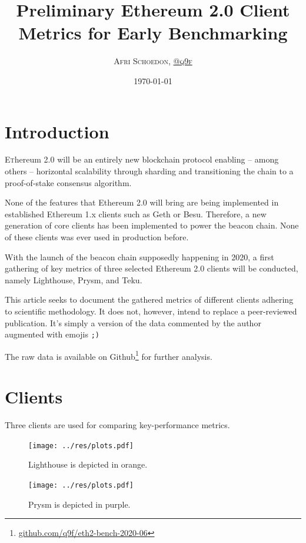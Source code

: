 \documentclass[twoside,twocolumn]{article}
\title{Preliminary Ethereum 2.0 Client Metrics for Early Benchmarking}
\author{\textsc{Afri Schoedon, \href{https://github.com/q9f}{@q9f}}}\date{\today}
\begin{document}
\maketitle
\section{Introduction}
\lettrine[nindent=0em,lines=3]{E}thereum 2.0 will be an entirely new blockchain protocol enabling -- among others -- horizontal scalability through sharding and transitioning the chain to a proof-of-stake consensus algorithm.\par

None of the features that Ethereum 2.0 will bring are being implemented in established Ethereum 1.x clients such as Geth or Besu. Therefore, a new generation of core clients has been implemented to power the beacon chain. None of these clients was ever used in production before.\par

With the launch of the beacon chain supposedly happening in 2020, a first gathering of key metrics of three selected Ethereum 2.0 clients will be conducted, namely Lighthouse, Prysm, and Teku.\par

This article seeks to document the gathered metrics of different clients adhering to scientific methodology. It does not, however, intend to replace a peer-reviewed publication. It's simply a version of the data commented by the author augmented with emojis \texttt{;)}\par

The raw data is available on Github\footnote{\href{https://github.com/q9f/eth2-bench-2020-06}{github.com/q9f/eth2-bench-2020-06}} for further analysis.

\section{Clients}
\label{sec:cli}

Three clients are used for comparing key-performance metrics.\par

\begin{figure}[t]
	\centering
	\texttt{[image: ../res/plots.pdf]}
	\caption{Lighthouse is depicted in orange.}
	\label{img:lh}
\end{figure}

\begin{figure}[t]
	\centering
	\texttt{[image: ../res/plots.pdf]}
	\caption{Prysm is depicted in purple.}
	\label{img:pr}
\end{figure}
\end{document}

